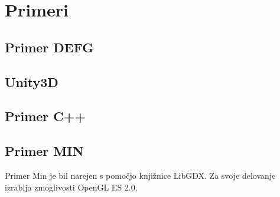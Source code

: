 \chapter{Primeri}

\section{Primer DEFG} 

\section{Unity3D}

\section{Primer C++}

\section{Primer MIN}

Primer Min je bil narejen s pomočjo knjižnice LibGDX. Za svoje delovanje izrablja zmoglivosti OpenGL ES 2.0. 



